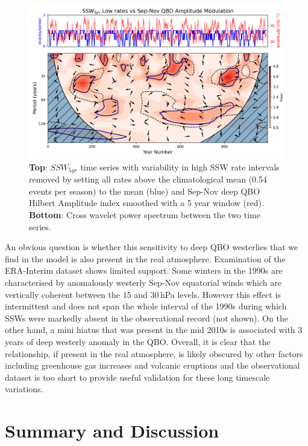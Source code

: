 \begin{figure}[h!]
\begin{center}
\includegraphics[width = 0.8\linewidth]{Figures/Figures-background/cross_power_SSWs_lowrate_vs_QBO_amplitude_modulation_5yr_mean.png}
\caption{\textbf{Top}: $SSW_{5yr}$ time series with variability in high SSW rate intervals removed by setting all rates above the climatological mean (0.54 events per season) to the mean (blue) and Sep-Nov deep QBO Hilbert Amplitude index smoothed with a 5 year window (red). \textbf{Bottom}: Cross wavelet power spectrum between the two time series.}
\label{fig:SSW_low_rate_QBO}
\end{center}
\end{figure}

An obvious question is whether this sensitivity to deep QBO westerlies that we find in the model is also present in the real atmosphere. Examination of the ERA-Interim dataset shows limited support. Some winters in the 1990s are characterised by anomalously westerly Sep-Nov equatorial winds which are vertically coherent between the 15 and 30\,hPa levels. However this effect is intermittent and does not span the whole interval of the 1990s during which SSWs were markedly absent in the observational record (not shown). On the other hand, a mini hiatus that was present in the mid 2010s is associated with 3 years of deep westerly anomaly in the QBO. Overall, it is clear that the relationship, if present in the real atmosphere, is likely obscured by other factors including greenhouse gas increases and volcanic eruptions and the observational dataset is too short to provide useful validation for these long timescale variations.  

\section{Summary and Discussion}

